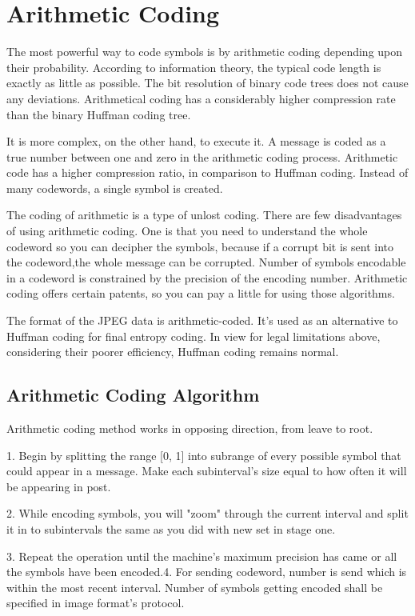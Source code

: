 \documentclass[a4paper, 12pt]{article}
\begin{document}
\section{ Arithmetic Coding}
\par The most powerful way to code symbols is by arithmetic coding depending upon their probability. According to information theory, the typical code length is exactly as little as possible. The bit resolution of binary code trees does not cause any deviations. Arithmetical coding has a considerably higher compression rate than the binary Huffman coding tree.\\
\par  It is more complex, on the other hand, to execute it. A message is coded as a true number between one and zero in the arithmetic coding process. Arithmetic code has a higher compression ratio, in comparison to Huffman coding. Instead of many codewords, a single symbol is created.\\
\par The coding of arithmetic is a type of unlost coding. There are few disadvantages of using arithmetic coding. One is that you need to understand the whole codeword so you can decipher the symbols, because if a corrupt bit is sent into the codeword,the whole message can be corrupted. Number of symbols encodable in a codeword is constrained by the precision of the encoding number. Arithmetic coding offers certain patents, so you can pay a little for using those algorithms.\\
\par The format of the JPEG data is arithmetic-coded. It’s used as an alternative to Huffman coding for final entropy coding. In view for legal limitations above, considering their poorer efficiency, Huffman coding remains normal.
\\

\subsection{Arithmetic Coding Algorithm}
\par Arithmetic coding method works in opposing direction, from leave to root.
\par 1. Begin by splitting the range [0, 1] into subrange of every possible symbol 
that could appear in a message. Make each subinterval's size equal to how 
often it will be appearing in post.
\par 2. While encoding symbols, you will "zoom" through the current interval and 
split it in to subintervals the same as you did with new set in stage one.
\par 3. Repeat the operation until the machine's maximum precision has came or all 
the symbols have been encoded.4. For sending codeword, number is send which is within the most recent interval. Number of symbols getting encoded shall be specified in image 
format's protocol.
\\
			
\end{document}
